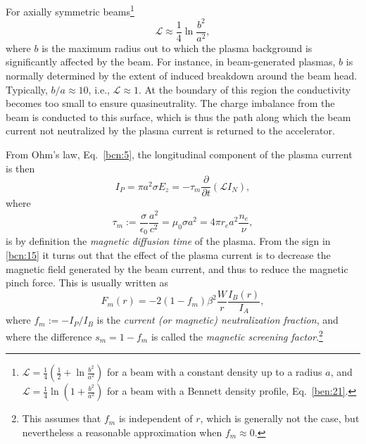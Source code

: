 \documentclass [12pt,a4paper,     ]{report} %
\newcommand{\DEF}{:=}                 %
\begin{document}
    For axially symmetric beams\footnote{$\mathcal{L} = \tfrac{1}{4} (\tfrac{1}{2}+\ln\tfrac{b^2}{a^2})$ for a beam with a constant density up to a radius $a$,  and $\mathcal{L} = \tfrac{1}{4} \ln(1+\tfrac{b^2}{a^2})$ for a beam with a Bennett density profile, Eq.~\eqref{ben:21}. }
%
\begin{equation}\label{bcn:14} %
       \mathcal{L} \approx \frac{1}{4} \ln \frac{b^2}{a^2},
\end{equation}
%
where $b$ is the maximum radius out to which the plasma background is significantly affected by the beam.  For instance, in beam-generated plasmas, $b$ is normally determined by the extent of induced breakdown around the beam head.  Typically, $b/a \approx 10$, i.e., $\mathcal{L} \approx 1$.  At the boundary of this region the conductivity becomes too small to ensure quasineutrality.  The charge imbalance from the beam is conducted to this surface, which is thus the path along which the beam current not neutralized by the plasma current is returned to the accelerator.

    From Ohm's law, Eq.~\eqref{bcn:5}, the longitudinal component of the plasma current is then
%
\begin{equation}\label{bcn:15} %
       I_P = \pi a^2 \sigma E_z
           = -\tau_m \frac{\partial}{\partial t} (\mathcal{L}I_N),
\end{equation}
%
where
%
\begin{equation}\label{bcn:16} %
      \tau_m \DEF \frac{\sigma}{\epsilon_0} \frac{a^2}{c^2} 
                = \mu_0 \sigma a^2
                = 4\pi r_e a^2 \frac{n_e}{\nu},
\end{equation}
%
is by definition the \emph{magnetic diffusion time} of the plasma.  From the sign in \eqref{bcn:15} it turns out that the effect of the plasma current is to decrease the magnetic field generated by the beam current, and thus to reduce the magnetic pinch force.  This is usually written as
%
\begin{equation}\label{bcn:17} %
     F_m(r) = -2 (1-f_m)\beta^2 \frac{W}{r} \frac{I_B(r)}{I_A},
\end{equation}
%
where $f_m \DEF -I_P/I_B$ is the \emph{current (or magnetic) neutralization fraction}, and where the difference $s_m = 1-f_m$ is called the \emph{magnetic screening factor}.\footnote{This assumes that $f_m$ is independent of $r$, which is generally not the case, but nevertheless a reasonable approximation when $f_m \approx 0$.}
\end{document}
